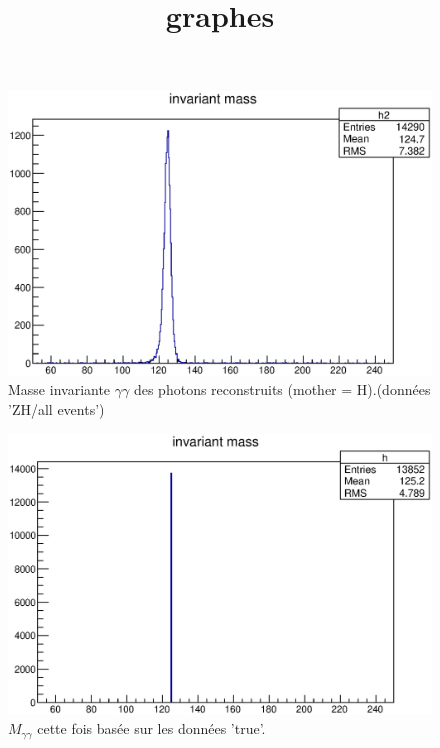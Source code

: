 \documentclass[11pt]{article} %
\title{graphes}
\date{} %
\begin{document}
\maketitle


\begin{figure}[h!]
  \caption{Masse invariante $\gamma \gamma$ des photons reconstruits (mother = H).(données 'ZH/all events')}
\includegraphics{../graphes/distrib_mgg_brute}
\end{figure}

\begin{figure}[h!]
  \caption{$M_{\gamma \gamma}$ cette fois basée sur les données 'true'.}
\includegraphics{../graphes/distrib_mgg_true_onlyH}
\end{figure}
\end{document}
